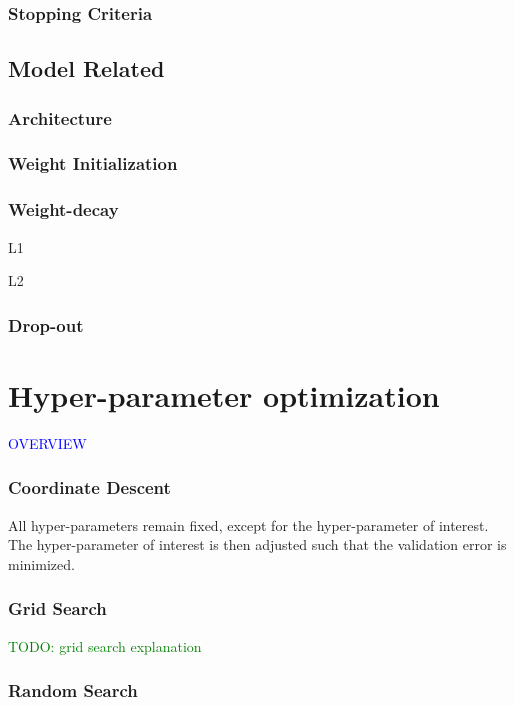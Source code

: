 \subsubsection{Stopping Criteria}

\subsection{Model Related}

\subsubsection{Architecture}

\subsubsection{Weight Initialization}

\subsubsection{Weight-decay}

L1

L2

\subsubsection{Drop-out}

\section{Hyper-parameter optimization}

\textcolor{blue}{OVERVIEW}

\subsubsection{Coordinate Descent}

All hyper-parameters remain fixed, except for the hyper-parameter of interest. The hyper-parameter of interest is then adjusted such that the validation error is minimized.

\subsubsection{Grid Search}

\textcolor{green}{TODO: grid search explanation}

\subsubsection{Random Search}

